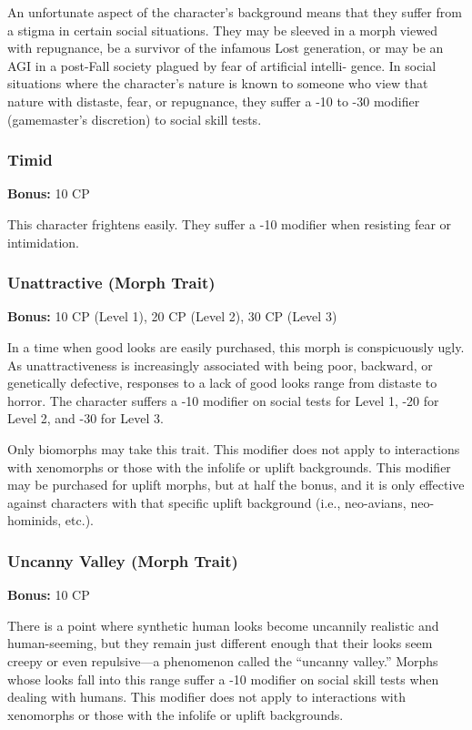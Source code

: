 An unfortunate aspect of the character’s background means that they suffer
from a stigma in certain social situations. They may be sleeved in a morph
viewed with repugnance, be a survivor of the infamous Lost generation, or may
be an AGI in a post-Fall society plagued by fear of artificial intelli-
gence. In social situations where the character’s nature is known to someone
who view that nature with distaste, fear, or repugnance, they suffer a -10 to
-30 modifier (gamemaster’s discretion) to social skill tests.

\subsubsection{Timid}
\textbf{Bonus:} 10 CP

This character frightens easily. They suffer a -10 modifier when resisting fear
or intimidation.

\subsubsection{Unattractive (Morph Trait)}
\textbf{Bonus:} 10 CP (Level 1), 20 CP (Level 2), 30 CP (Level 3)

In a time when good looks are easily purchased, this morph is conspicuously
ugly. As unattractiveness is increasingly associated with being poor, backward,
or genetically defective, responses to a lack of good looks range from distaste
to horror. The character suffers a -10 modifier on social tests for Level 1,
-20 for Level 2, and -30 for Level 3.

Only biomorphs may take this trait. This modifier does not apply to
interactions with xenomorphs or those with the infolife or uplift
backgrounds. This modifier may be purchased for uplift morphs, but at half the
bonus, and it is only effective against characters with that specific uplift
background (i.e., neo-avians, neo-hominids, etc.).

\subsubsection{Uncanny Valley (Morph Trait)}
\textbf{Bonus:} 10 CP

There is a point where synthetic human looks become uncannily realistic and
human-seeming, but they remain just different enough that their looks seem
creepy or even repulsive—a phenomenon called the “uncanny valley.” Morphs whose
looks fall into this range suffer a -10 modifier on social skill tests when
dealing with humans. This modifier does not apply to interactions with
xenomorphs or those with the infolife or uplift backgrounds.

